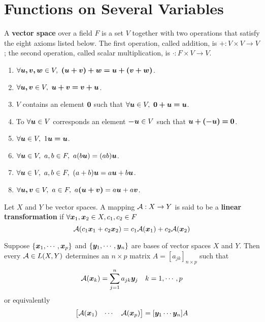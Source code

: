 \section{Functions on Several Variables}
    \begin{defi}
        A \textbf{vector space} over a field $F$ is a set $V$ together with two operations that satisfy the eight axioms listed below. The first operation, called addition, is $+ : V \times V \to V$; the second operation, called scalar multiplication, is $\cdot : F \times V \to V$.
        \begin{enumerate}
            \item $\forall \bs{u,v,w} \in V, \ \bs{(u+v)+w = u+(v+w)}$.
            \item $\forall \boldsymbol{u,v} \in V, \ \boldsymbol{u+v = v+u}$.
            \item $V$ contains an element $\boldsymbol{0}$ such that $\forall \boldsymbol{u} \in V, \ \boldsymbol{0 + u = u}$.
            \item To $\forall \boldsymbol{u} \in V$ corresponds an element $\boldsymbol{-u} \in V$ such that $\boldsymbol{u+(-u) = 0}$.
            \item $\forall \boldsymbol{u} \in V, \ 1\boldsymbol{u = u}$.
            \item $\forall \bs{u} \in V, \ a,b \in F, \ a(b\bs{u}) = (ab)\bs{u}$.
            \item $\forall \bs{u} \in V, \ a,b \in F, \ (a+b)\bs{u} = a\bs{u} + b\bs{u}$.
            \item $\forall \bs{u,v} \in V, \ a \in F, \ a\bs{(u+v)} = a\bs{u} + a\bs{v}$.
        \end{enumerate}
    \end{defi}

    \begin{defi}
        Let $X$ and $Y$ be vector spaces. A mapping $\mathcal{A}: X \to Y$ is said to be a \textbf{linear transformation} if $\forall \boldsymbol{x}_1,\boldsymbol{x}_2\in X, c_1,c_2\in F$
        \begin{equation}
            \mathcal{A}(c_1\boldsymbol{x}_1+c_2\boldsymbol{x}_2) = c_1\mathcal{A}(\boldsymbol{x}_1) + c_2\mathcal{A}(\boldsymbol{x}_2)
        \end{equation}
    \end{defi}

        Suppose $\{ \boldsymbol{x}_1,\cdots, \boldsymbol{x}_p \}$ and $\{ \boldsymbol{y}_1,\cdots, \boldsymbol{y}_n \}$ are bases of vector spaces $X$ and $Y$. Then every $\mathcal{A} \in L(X,Y)$ determines an $n \times p$ matrix $A = [a_{jk}]_{n \times p}$ such that
        \begin{equation}
            \mathcal{A}(\boldsymbol{x}_k) = \sum_{j=1}^n a_{jk}\boldsymbol{y}_j \quad k = 1, \cdots, p
        \end{equation}
        or equivalently
        \begin{equation}
            \begin{bmatrix}
                \mathcal{A}(\boldsymbol{x}_1) & \cdots & \mathcal{A}(\boldsymbol{x}_p)
            \end{bmatrix}
            = [\boldsymbol{y}_1 \cdots \boldsymbol{y}_n] A
        \end{equation}

